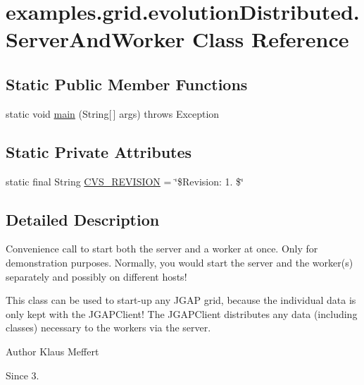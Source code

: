 \hypertarget{classexamples_1_1grid_1_1evolution_distributed_1_1_server_and_worker}{\section{examples.\-grid.\-evolution\-Distributed.\-Server\-And\-Worker Class Reference}
\label{classexamples_1_1grid_1_1evolution_distributed_1_1_server_and_worker}
}
\subsection*{Static Public Member Functions}
\begin{DoxyCompactItemize}
\item 
static void \hyperlink{classexamples_1_1grid_1_1evolution_distributed_1_1_server_and_worker_a083fa0203088b22f2043fb45f5bbf9fe}{main} (String\mbox{[}$\,$\mbox{]} args)  throws Exception 
\end{DoxyCompactItemize}
\subsection*{Static Private Attributes}
\begin{DoxyCompactItemize}
\item 
static final String \hyperlink{classexamples_1_1grid_1_1evolution_distributed_1_1_server_and_worker_a41a7ce45203c837dd7d1cd406711f4e6}{C\-V\-S\-\_\-\-R\-E\-V\-I\-S\-I\-O\-N} = \char`\"{}\$Revision\-: 1. \$\char`\"{}
\end{DoxyCompactItemize}


\subsection{Detailed Description}
Convenience call to start both the server and a worker at once. Only for demonstration purposes. Normally, you would start the server and the worker(s) separately and possibly on different hosts!

This class can be used to start-\/up any J\-G\-A\-P grid, because the individual data is only kept with the J\-G\-A\-P\-Client! The J\-G\-A\-P\-Client distributes any data (including classes) necessary to the workers via the server.

\begin{DoxyAuthor}{Author}
Klaus Meffert 
\end{DoxyAuthor}
\begin{DoxySince}{Since}
3. 
\end{DoxySince}


